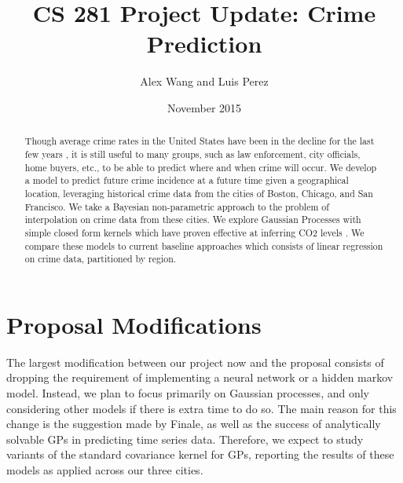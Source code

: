 \documentclass[11pt]{article}
\begin{document}
\title{CS 281 Project Update: Crime Prediction}
\author{Alex Wang  and Luis Perez}
\date{November 2015}

\maketitle

\begin{abstract}
Though average crime rates in the United States have been in the decline for the last few years \cite{seasonal_pattern}, it is still useful to many groups, such as law enforcement, city officials, home buyers, etc., to be able to predict where and when crime will occur. We develop a model to predict future crime incidence at a future time given a geographical location, leveraging historical crime data from the cities of Boston, Chicago, and San Francisco. We take a Bayesian non-parametric approach to the problem of interpolation on crime data from these cities. We explore Gaussian Processes with simple closed form kernels which have proven effective at inferring CO2 levels \cite{gaussian_models}. We compare these models to current baseline approaches which consists of linear regression on crime data, partitioned by region.
\end{abstract}


\section{Proposal Modifications}
The largest modification between our project now and the proposal consists of dropping the requirement of implementing a neural network or a hidden markov model. Instead, we plan to focus primarily on Gaussian processes, and only considering other models if there is extra time to do so. The main reason for this change is the suggestion made by Finale, as well as the success of analytically solvable GPs in predicting time series data. Therefore, we expect to study variants of the standard covariance kernel for GPs, reporting the results of these models as applied across our three cities. \\
\end{document}
